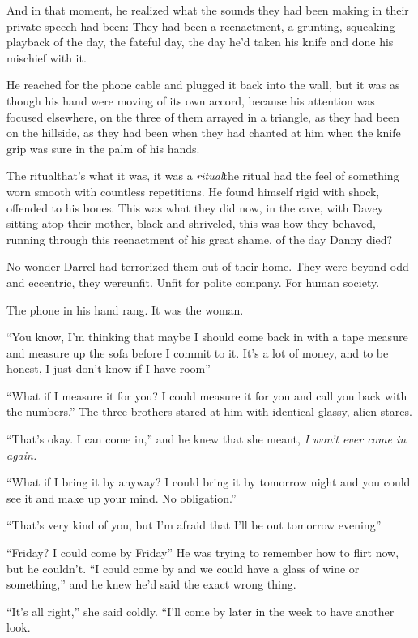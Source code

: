 And in that moment, he realized what the sounds they had been making
in their private speech had been:  They had been a reenactment, a
grunting, squeaking playback of the day, the fateful day, the day he'd
taken his knife and done his mischief with it.

He reached for the phone cable and plugged it back into the wall, but
it was as though his hand were moving of its own accord, because his
attention was focused elsewhere, on the three of them arrayed in a
triangle, as they had been on the hillside, as they had been when they
had chanted at him when the knife grip was sure in the palm of his
hands.

The ritual\dash{}that's what it was, it was a \textit{ritual}\dash{}the ritual
had the feel of something worn smooth with countless repetitions.  He
found himself rigid with shock, offended to his bones.  This was what
they did now, in the cave, with Davey sitting atop their mother, black
and shriveled, this was how they behaved, running through this
reenactment of his great shame, of the day Danny died?

No wonder Darrel had terrorized them out of their home.  They were
beyond odd and eccentric, they were\dash{}unfit.  Unfit for polite
company.  For human society.

The phone in his hand rang.  It was the woman.

``You know, I'm thinking that maybe I should come back in with a tape
measure and measure up the sofa before I commit to it.  It's a lot of
money, and to be honest, I just don't know if I have room\dash{}''

``What if I measure it for you?  I could measure it for you and call
you back with the numbers.'' The three brothers stared at him with
identical glassy, alien stares.

``That's okay.  I can come in,'' and he knew that she meant, \textit{I
won't ever come in again.}

``What if I bring it by anyway?  I could bring it by tomorrow night
and you could see it and make up your mind.  No obligation.''

``That's very kind of you, but I'm afraid that I'll be out tomorrow
evening\dash{}''

``Friday?  I could come by Friday\dash{}'' He was trying to remember how
to flirt now, but he couldn't.  ``I could come by and we could have a
glass of wine or something,'' and he knew he'd said the exact wrong
thing.

``It's all right,'' she said coldly.  ``I'll come by later in the week
to have another look.

